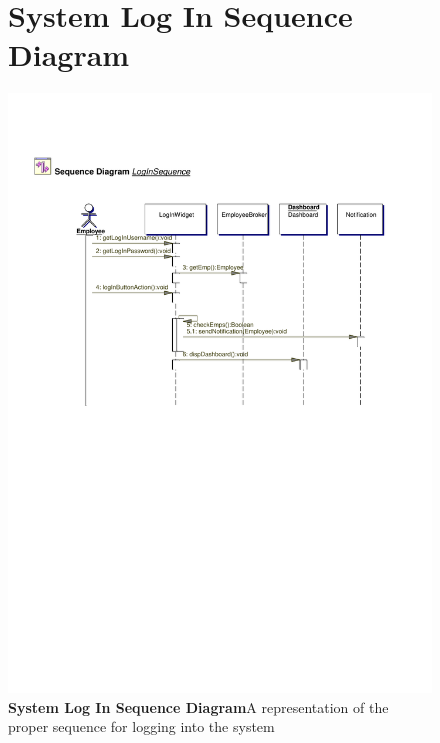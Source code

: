 \documentclass[letterpaper,12pt]{report}
\begin{document}
\begin{figure}[hbp]
 \section{System Log In Sequence Diagram}
 \includegraphics[scale=0.65]{externals/SequenceDiagrams7.pdf}
 \caption{\small
\textbf{System Log In Sequence Diagram}\newline A representation of the proper sequence for logging into the system}\label{fig:seqLogInSys}
\end{figure}
\newpage
\end{document}
